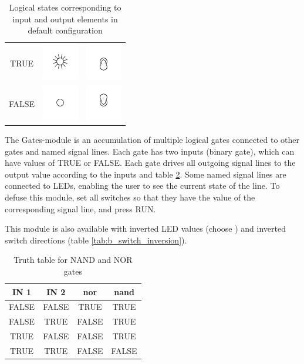 \documentclass[a4paper]{report}
\author{hephaisto}
\title{\moduleTitle}
\begin{document}
\begin{table}
	\centering
	\begin{tabular}{|cm{1cm}m{1cm}|}\hline
		TRUE & \includegraphics{../common/cliparts/led_on} & \includegraphics{../common/cliparts/switch_down} \\
		FALSE & \includegraphics{../common/cliparts/led_off} & \includegraphics{../common/cliparts/switch_up} \\\hline
	\end{tabular}
	\caption{Logical states corresponding to input and output elements in default configuration}
	\label{tab:b_io_logic}
\end{table}





The Gates-module is an accumulation of multiple logical gates connected to other gates and named signal lines.
Each gate has two inputs (binary gate), which can have values of TRUE or FALSE.
Each gate drives all outgoing signal lines to the output value according to the inputs and table \ref{tab:b_truthtable}.
Some named signal lines are connected to LEDs, enabling the user to see the current state of the line.
To defuse this module, set all switches so that they have the value of the corresponding signal line, and press RUN.

This module is also available with inverted LED values (choose \ledInversionNumbers ) and inverted switch directions (table \ref{tab:b_switch_inversion}).

\begin{table}
	\centering
	\begin{tabular}{|cc|cc|}\hline
		IN 1 & IN 2 & nor & nand \\\hline
		FALSE & FALSE & TRUE & TRUE \\
		FALSE & TRUE & FALSE & TRUE \\
		TRUE & FALSE & FALSE & TRUE \\
		TRUE & TRUE & FALSE & FALSE \\\hline
	\end{tabular}
	\caption{Truth table for NAND and NOR gates}
	\label{tab:b_truthtable}
\end{table}


\end{document}
